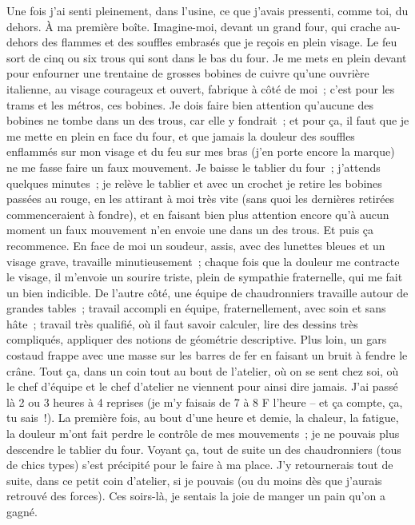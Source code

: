 \documentclass[french,twoside]{book} %
\begin{document}
Une fois j'ai senti pleinement, dans l'usine, ce que j'avais pressenti, comme toi, du dehors. À ma première boîte. Imagine-moi, devant un grand four, qui crache au-dehors des flammes et des souffles embrasés que je reçois en plein visage. Le feu sort de cinq ou six trous qui sont dans le bas du four. Je me mets en plein devant pour enfourner une trentaine de grosses bobines de cuivre qu'une ouvrière italienne, au visage courageux et ouvert, fabrique à côté de moi ; c'est pour les trams et les métros, ces bobines. Je dois faire bien attention qu'aucune des bobines ne tombe dans un des trous, car elle y fondrait ; et pour ça, il faut que je me mette en plein en face du four, et que jamais la douleur des souffles enflammés sur mon visage et du feu sur mes bras (j'en porte encore la marque) ne me fasse faire un faux mouvement. Je baisse le tablier du four ; j'attends quelques minutes ; je relève le tablier et avec un crochet je retire les bobines passées au rouge, en les attirant à moi très vite (sans quoi les dernières retirées commenceraient à fondre), et en faisant bien plus attention encore qu'à aucun moment un faux mouvement n'en envoie une dans un des trous. Et puis ça recommence. En face de moi un soudeur, assis, avec des lunettes bleues et un visage grave, travaille minutieusement ; chaque fois que la douleur me contracte le visage, il m'envoie un sourire triste, plein de sympathie fraternelle, qui me fait un bien indicible. De l'autre côté, une équipe de chaudronniers travaille autour de grandes tables ; travail accompli en équipe, fraternellement, avec soin et sans hâte ; travail très qualifié, où il faut savoir calculer, lire des dessins très compliqués, appliquer des notions de géométrie descriptive. Plus loin, un gars costaud frappe avec une masse sur les barres de fer en faisant un bruit à fendre le crâne. Tout ça, dans un coin tout au bout de l'atelier, où on se sent chez soi, où le chef d'équipe et le chef d'atelier ne viennent pour ainsi dire jamais. J'ai passé là 2 ou 3 heures à 4 reprises (je m'y faisais de 7 à 8 F l'heure – et ça compte, ça, tu sais !). La première fois, au bout d'une heure et demie, la chaleur, la fatigue, la douleur m'ont fait perdre le contrôle de mes mouvements ; je ne pouvais plus descendre le tablier du four. Voyant ça, tout de suite un des chaudronniers (tous de chics types) s'est précipité pour le faire à ma place. J'y retournerais tout de suite, dans ce petit coin d'atelier, si je pouvais (ou du moins dès que j'aurais retrouvé des forces). Ces soirs-là, je sentais la joie de manger un pain qu'on a gagné.\par
\end{document}

